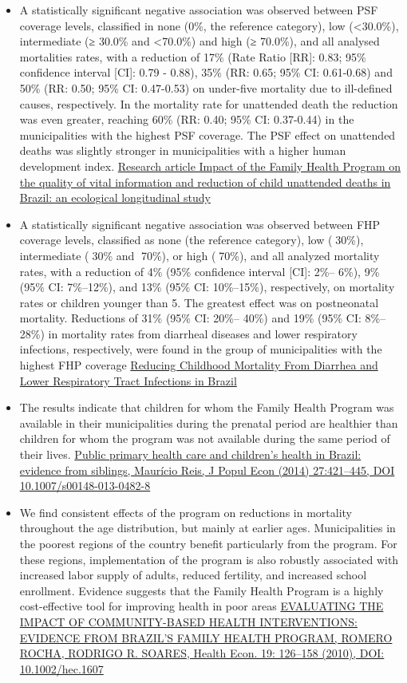 \documentclass[]{book}
\begin{document}
\begin{itemize}
\item
  A statistically significant negative association was observed between PSF coverage levels, classified in none (0\%, the reference category), low (\textless{}30.0\%), intermediate (≥ 30.0\% and \textless{}70.0\%) and high (≥ 70.0\%), and all analysed mortalities rates, with a reduction of 17\% (Rate Ratio {[}RR{]}: 0.83; 95\% confidence interval {[}CI{]}: 0.79 - 0.88), 35\% (RR: 0.65; 95\% CI: 0.61-0.68) and 50\% (RR: 0.50; 95\% CI: 0.47-0.53) on under-five mortality due to ill-defined causes, respectively. In the mortality rate for unattended death the reduction was even greater, reaching 60\% (RR: 0.40; 95\% CI: 0.37-0.44) in the municipalities with the highest PSF coverage. The PSF effect on unattended deaths was slightly stronger in municipalities with a higher human development index. \href{https://bmcpublichealth.biomedcentral.com/track/pdf/10.1186/1471-2458-10-380}{Research article Impact of the Family Health Program on the quality of vital information and reduction of child unattended deaths in Brazil: an ecological longitudinal study}
\item
  A statistically significant negative association was observed between FHP coverage levels, classified as none (the reference category), low (30\%), intermediate (30\% and 70\%), or high (70\%), and all analyzed mortality rates, with a reduction of 4\% (95\% confidence interval {[}CI{]}: 2\%-- 6\%), 9\% (95\% CI: 7\%--12\%), and 13\% (95\% CI: 10\%--15\%), respectively, on mortality rates or children younger than 5. The greatest effect was on postneonatal mortality. Reductions of 31\% (95\% CI: 20\%-- 40\%) and 19\% (95\% CI: 8\%--28\%) in mortality rates from diarrheal diseases and lower respiratory infections, respectively, were found in the group of municipalities with the highest FHP coverage \href{https://sci-hub.tw/10.1542/peds.2009-3197}{Reducing Childhood Mortality From Diarrhea and Lower Respiratory Tract Infections in Brazil}
\item
  The results indicate that children for whom the Family Health Program was available in their municipalities during the prenatal period are healthier than children for whom the program was not available during the same period of their lives. \href{https://sci-hub.tw/10.1007/s00148-013-0482-8}{Public primary health care and children's health in Brazil: evidence from siblings, Maurício Reis, J Popul Econ (2014) 27:421--445, DOI 10.1007/s00148-013-0482-8}
\item
  We find consistent effects of the program on reductions in mortality throughout the age distribution, but mainly at earlier ages. Municipalities in the poorest regions of the country benefit particularly from the program. For these regions, implementation of the program is also robustly associated with increased labor supply of adults, reduced fertility, and increased school enrollment. Evidence suggests that the Family Health Program is a highly cost-effective tool for improving health in poor areas \href{https://sci-hub.tw/10.1002/hec.1607}{EVALUATING THE IMPACT OF COMMUNITY-BASED HEALTH INTERVENTIONS: EVIDENCE FROM BRAZIL'S FAMILY HEALTH PROGRAM, ROMERO ROCHA, RODRIGO R. SOARES, Health Econ. 19: 126--158 (2010), DOI: 10.1002/hec.1607}

\end{itemize}
\end{document}
